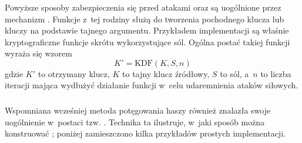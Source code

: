 \subsubsection{}
Powyższe sposoby zabezpieczenia się przed atakami  oraz 
są uogólnione przez mechanizm . Funkcje z~tej
rodziny służą do tworzenia pochodnego klucza lub kluczy na podstawie tajnego
argumentu. Przykładem implementacji  są właśnie kryptograficzne
funkcje skrótu wykorzystujące sól. Ogólna postać takiej funkcji wyraża się
wzorem
    $$K' = \mathrm{KDF}(K, S, n)$$
gdzie $K'$ to otrzymany klucz, $K$ to tajny klucz źródłowy, $S$ to sól, a~$n$
to liczba iteracji mająca wydłużyć działanie funkcji w~celu udaremnienia ataków
siłowych.

\subsubsection{}
Wspomniana wcześniej metoda potęgowania haszy również znalazła swoje
uogólnienie w~postaci tzw. . Technika ta ilustruje, w~jaki
sposób można konstruować ; poniżej zamieszczono
kilka przykładów prostych implementacji.

